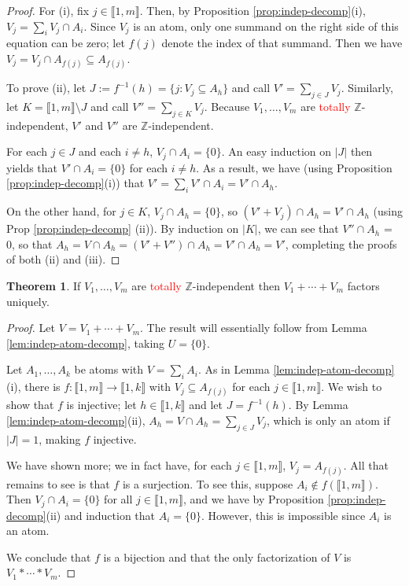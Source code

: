 \documentclass{report}
\newcommand{\ZZ}{\mathbb{Z}}
\newcommand{\llb}{\llbracket}
\newcommand{\rrb}{\rrbracket}
\renewcommand{\:}{\text{:}}
\theoremstyle{definition}
\newtheorem{thm}[defn]{Theorem}
\begin{document}
\begin{proof}
For (i), fix $j\in \llb 1,m \rrb$.
Then, by Proposition \ref{prop:indep-decomp}(i), $V_j = \sum_i V_j \cap A_i$.
Since $V_j$ is an atom, only one summand on the right side of this equation can be zero; let $f(j)$ denote the index of that summand.
Then we have $V_j = V_j \cap A_{f(j)} \subseteq A_{f(j)}$.

To prove (ii), let $J := f^{-1}(h) = \{j: V_j \subseteq A_h\}$ and call $V' = \sum_{j\in J} V_j$.
Similarly, let $K = \llb 1,m \rrb \setminus J$ and call $V'' = \sum_{j\in K} V_j$.
Because $V_1,\dots, V_m$ are \textcolor{red}{totally} $\ZZ$-independent, $V'$ and $V''$ are $\ZZ$-independent.

For each $j\in J$ and each $i\neq h$, $V_j\cap A_i = \{0\}$. 
An easy induction on $|J|$ then yields that $V' \cap A_i = \{0\}$ for each $i\neq h$.
As a result, we have (using Proposition \ref{prop:indep-decomp}(i)) that $V' = \sum_i V'\cap A_i = V' \cap A_h$.

On the other hand, for $j\in K$, $V_j\cap A_h = \{0\}$, so $(V' + V_j) \cap A_h = V' \cap A_h$ (using Prop \ref{prop:indep-decomp} (ii)).
By induction on $|K|$, we can see that $V'' \cap A_h$ = 0, so that $A_h = V\cap A_h = (V' + V'')\cap A_h = V' \cap A_h = V'$, completing the proofs of both (ii) and (iii).
\end{proof}

\begin{thm} \label{thm:ind-atoms}
If $V_1,\dots,V_m$ are \textcolor{red}{totally} $\ZZ$-independent then $V_1+\cdots + V_m$ factors uniquely.
\end{thm}

\begin{proof}
Let $V = V_1+\cdots + V_m$.
The result will essentially follow from Lemma \ref{lem:indep-atom-decomp}, taking $U = \{0\}$.

Let $A_1,\dots, A_k$ be atoms with $V = \sum_i A_i$.
As in Lemma \ref{lem:indep-atom-decomp}(i), there is $f:\llb 1,m \rrb \to \llb 1,k\rrb$ with $V_j \subseteq A_{f(j)}$ for each $j\in \llb 1,m\rrb$.
We wish to show that $f$ is injective; let $h\in \llb 1,k \rrb$ and let $J = f^{-1}(h)$.
By Lemma \ref{lem:indep-atom-decomp}(ii), $A_h = V \cap A_h = \sum_{j\in J} V_j$, which is only an atom if $|J|=1$, making $f$ injective.  

We have shown more; we in fact have, for each $j\in \llb 1,m \rrb$, $V_j = A_{f(j)}$.
All that remains to see is that $f$ is a surjection.
To see this, suppose $A_i \notin f(\llb 1,m \rrb)$.
Then $V_j \cap A_i = \{0\}$ for all $j\in  \llb 1,m \rrb$, and we have by Proposition \ref{prop:indep-decomp}(ii) and induction that $A_i = \{0\}$.
However, this is impossible since $A_i$ is an atom.  

We conclude that $f$ is a bijection and that the only factorization of $V$ is $V_1*\cdots*V_m$.
\end{proof}
\end{document}

